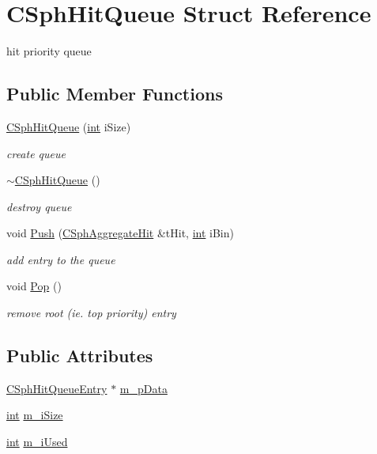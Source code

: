 \hypertarget{structCSphHitQueue}{\section{C\-Sph\-Hit\-Queue Struct Reference}
\label{structCSphHitQueue}
}


hit priority queue  


\subsection*{Public Member Functions}
\begin{DoxyCompactItemize}
\item 
\hyperlink{structCSphHitQueue_a33aafae702b89218e959b63b75f440bf}{C\-Sph\-Hit\-Queue} (\hyperlink{sphinxexpr_8cpp_a4a26e8f9cb8b736e0c4cbf4d16de985e}{int} i\-Size)
\begin{DoxyCompactList}\small\item\em create queue \end{DoxyCompactList}\item 
\hyperlink{structCSphHitQueue_adf6718c5738a8dca0876fa4b8634308d}{$\sim$\-C\-Sph\-Hit\-Queue} ()
\begin{DoxyCompactList}\small\item\em destroy queue \end{DoxyCompactList}\item 
void \hyperlink{structCSphHitQueue_a16419a41e5d0a4efbceac172540b13a3}{Push} (\hyperlink{structCSphAggregateHit}{C\-Sph\-Aggregate\-Hit} \&t\-Hit, \hyperlink{sphinxexpr_8cpp_a4a26e8f9cb8b736e0c4cbf4d16de985e}{int} i\-Bin)
\begin{DoxyCompactList}\small\item\em add entry to the queue \end{DoxyCompactList}\item 
void \hyperlink{structCSphHitQueue_a5de745ea26364e7f794a87a9b1c257e3}{Pop} ()
\begin{DoxyCompactList}\small\item\em remove root (ie. top priority) entry \end{DoxyCompactList}\end{DoxyCompactItemize}
\subsection*{Public Attributes}
\begin{DoxyCompactItemize}
\item 
\hyperlink{structCSphHitQueueEntry}{C\-Sph\-Hit\-Queue\-Entry} $\ast$ \hyperlink{structCSphHitQueue_a1319eff0345e7d228ed3312575c57c67}{m\-\_\-p\-Data}
\item 
\hyperlink{sphinxexpr_8cpp_a4a26e8f9cb8b736e0c4cbf4d16de985e}{int} \hyperlink{structCSphHitQueue_a09f9607b8c1793ec0c00dd7fb072cb8a}{m\-\_\-i\-Size}
\item 
\hyperlink{sphinxexpr_8cpp_a4a26e8f9cb8b736e0c4cbf4d16de985e}{int} \hyperlink{structCSphHitQueue_a04f2e4d13de5ca8766eff04cb1db9b09}{m\-\_\-i\-Used}
\end{DoxyCompactItemize}


